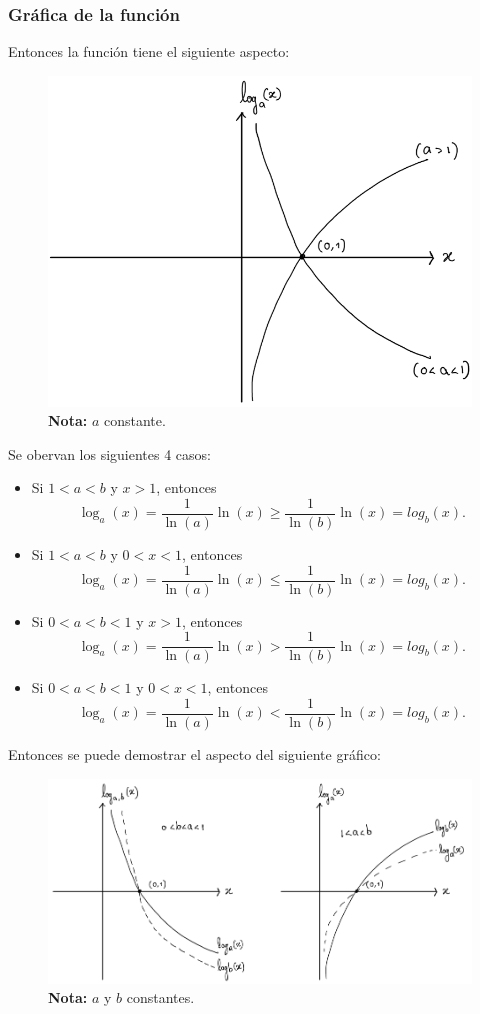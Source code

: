 \documentclass{article}
\numberwithin{equation}{section}
\begin{document}
\subsubsection{Gráfica de la función}

Entonces la función tiene el siguiente aspecto:

\begin{figure}[H]
    \centering
    \includegraphics[scale=0.4]{images/fig17.png}
    \caption{\textbf{Nota:} $a$ constante.}
    \label{fig:fig17}
\end{figure}

Se obervan los siguientes 4 casos:
\begin{itemize}
\item Si $1<a<b$ y $x>1$, entonces $$\log_a(x)=\frac{1}{\ln(a)}\ln(x)\geq \frac{1}{\ln(b)}\ln(x)=log_b(x).$$
\item Si $1<a<b$ y $0<x<1$, entonces $$\log_a(x)=\frac{1}{\ln(a)}\ln(x)\leq \frac{1}{\ln(b)}\ln(x)=log_b(x).$$
\item Si $0<a<b<1$ y $x>1$, entonces $$\log_a(x)=\frac{1}{\ln(a)}\ln(x)> \frac{1}{\ln(b)}\ln(x)=log_b(x).$$
\item Si $0<a<b<1$ y $0<x<1$, entonces $$\log_a(x)=\frac{1}{\ln(a)}\ln(x)< \frac{1}{\ln(b)}\ln(x)=log_b(x).$$    
\end{itemize}

Entonces se puede demostrar el aspecto del siguiente gráfico:

\begin{figure}[H]
    \centering
    \includegraphics[scale=0.5]{images/fig18.png}
    \caption{\textbf{Nota:} $a$ y $b$ constantes.}
    \label{fig:fig18}
\end{figure}
\end{document}
